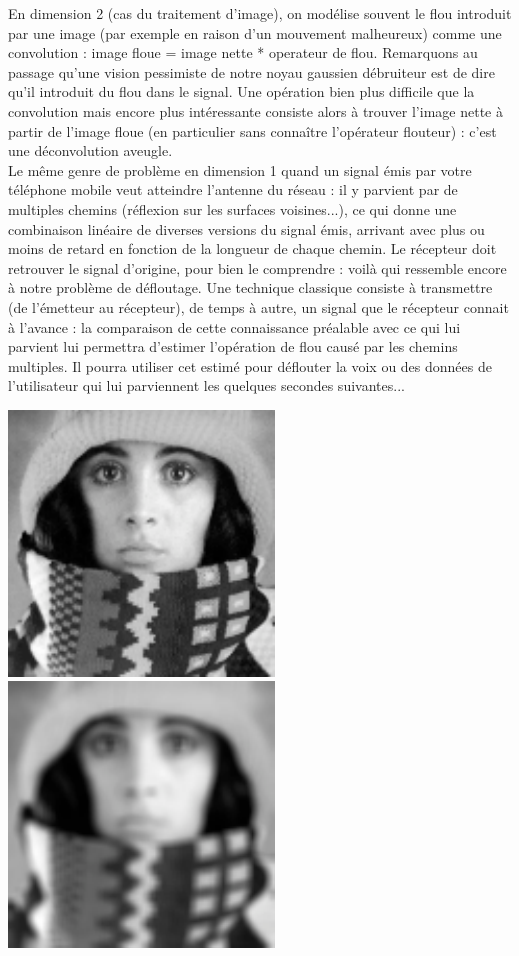 \begin{example}
En dimension 2 (cas du traitement d'image), on modélise souvent le
flou introduit par une image (par exemple en raison d'un mouvement
malheureux) comme une convolution : image floue = image nette *
operateur de flou. Remarquons au passage qu'une vision pessimiste de
notre noyau gaussien débruiteur est de dire qu'il introduit du flou
dans le signal. Une opération bien plus difficile que la convolution
mais encore plus intéressante consiste alors à trouver l'image nette à
partir de l'image floue (en particulier sans connaître l'opérateur
flouteur) : c'est une déconvolution aveugle. \\ Le même genre de
problème en dimension 1 quand un signal émis par votre téléphone
mobile veut atteindre l'antenne du réseau : il y parvient par de
multiples chemins (réflexion sur les surfaces voisines...), ce qui donne une
combinaison linéaire de diverses versions du signal émis, arrivant
avec plus ou moins de retard en fonction de la longueur de chaque
chemin. Le récepteur doit retrouver le signal d'origine, pour bien le
comprendre : voilà qui ressemble encore à notre problème de
défloutage. Une technique classique consiste à transmettre (de
l'émetteur au récepteur), de temps à autre, un signal que le
récepteur connait à l'avance : la comparaison de cette connaissance
préalable avec ce qui lui parvient lui permettra d'estimer l'opération
de { flou } causé par les chemins multiples. Il pourra utiliser
cet estimé pour déflouter la voix ou des données de l'utilisateur qui
lui parviennent les quelques secondes suivantes...
\begin{center}
\includegraphics[scale=1]{image1.pdf} 
\includegraphics[scale=1]{image2.pdf}

\end{center}
\end{example}
